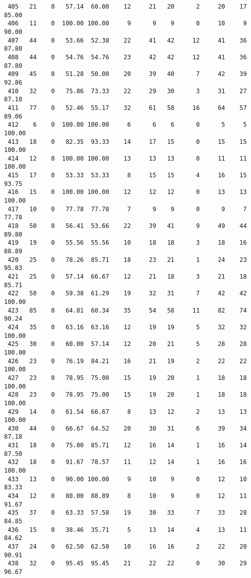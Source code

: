 \begin{verbatim}
 405   21    0   57.14  60.00    12     21   20      2     20    17    85.00
 406   11    0  100.00 100.00     9      9    9      0     10     9    90.00
 407   44    0   53.66  52.38    22     41   42     12     41    36    87.80
 408   44    0   54.76  54.76    23     42   42     12     41    36    87.80
 409   45    0   51.28  50.00    20     39   40      7     42    39    92.86
 410   32    0   75.86  73.33    22     29   30      3     31    27    87.10
 411   77    0   52.46  55.17    32     61   58     16     64    57    89.06
 412    6    0  100.00 100.00     6      6    6      0      5     5   100.00
 413   18    0   82.35  93.33    14     17   15      0     15    15   100.00
 414   12    0  100.00 100.00    13     13   13      0     11    11   100.00
 415   17    0   53.33  53.33     8     15   15      4     16    15    93.75
 416   15    0  100.00 100.00    12     12   12      0     13    13   100.00
 417   10    0   77.78  77.78     7      9    9      0      9     7    77.78
 418   50    0   56.41  53.66    22     39   41      9     49    44    89.80
 419   19    0   55.56  55.56    10     18   18      3     18    16    88.89
 420   25    0   78.26  85.71    18     23   21      1     24    23    95.83
 421   25    0   57.14  66.67    12     21   18      3     21    18    85.71
 422   50    0   59.38  61.29    19     32   31      7     42    42   100.00
 423   85    0   64.81  60.34    35     54   58     11     82    74    90.24
 424   35    0   63.16  63.16    12     19   19      5     32    32   100.00
 425   30    0   60.00  57.14    12     20   21      5     28    28   100.00
 426   23    0   76.19  84.21    16     21   19      2     22    22   100.00
 427   23    0   78.95  75.00    15     19   20      1     18    18   100.00
 428   23    0   78.95  75.00    15     19   20      1     18    18   100.00
 429   14    0   61.54  66.67     8     13   12      2     13    13   100.00
 430   44    0   66.67  64.52    20     30   31      6     39    34    87.18
 431   18    0   75.00  85.71    12     16   14      1     16    14    87.50
 432   18    0   91.67  78.57    11     12   14      1     16    16   100.00
 433   13    0   90.00 100.00     9     10    9      0     12    10    83.33
 434   12    0   80.00  88.89     8     10    9      0     12    11    91.67
 435   37    0   63.33  57.58    19     30   33      7     33    28    84.85
 436   15    0   38.46  35.71     5     13   14      4     13    11    84.62
 437   24    0   62.50  62.50    10     16   16      2     22    20    90.91
 438   32    0   95.45  95.45    21     22   22      0     30    29    96.67

\end{verbatim}
